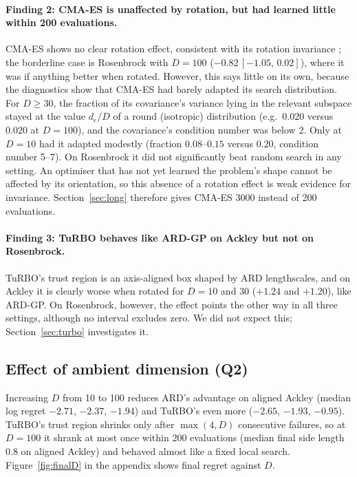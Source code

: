 \documentclass[12pt]{article}
\newcommand{\ci}[2]{\,[#1,\,#2]}
\begin{document}
\paragraph{Finding 2: CMA-ES is unaffected by rotation, but had learned little within 200 evaluations.}
CMA-ES shows no clear rotation effect, consistent with its rotation invariance \cite{hansen2016cma};
the borderline case is Rosenbrock with $D=100$ ($-0.82\ci{-1.05}{0.02}$), where it was if anything
better when rotated. However, this says little on its own, because the diagnostics show that CMA-ES
had barely adapted its search distribution. For $D\ge 30$, the fraction of its covariance's variance
lying in the relevant subspace stayed at the value $d_e/D$ of a round (isotropic) distribution
(e.g.\ $0.020$ versus $0.020$ at $D=100$), and the covariance's condition number was below 2. Only at
$D=10$ had it adapted modestly (fraction $0.08$--$0.15$ versus $0.20$, condition number 5--7). On
Rosenbrock it did not significantly beat random search in any setting. An optimiser that has not yet
learned the problem's shape cannot be affected by its orientation, so this absence of a rotation
effect is weak evidence for invariance. Section~\ref{sec:long} therefore gives CMA-ES 3000 instead of
200 evaluations.

\paragraph{Finding 3: TuRBO behaves like ARD-GP on Ackley but not on Rosenbrock.} TuRBO's trust region is
an axis-aligned box shaped by ARD lengthscales, and on Ackley it is clearly worse when rotated for
$D=10$ and $30$ ($+1.24$ and $+1.20$), like ARD-GP. On Rosenbrock, however, the effect points the
other way in all three settings, although no interval excludes zero. We did not expect this;
Section~\ref{sec:turbo} investigates it.

\subsection{Effect of ambient dimension (Q2)}
Increasing $D$ from 10 to 100 reduces ARD's advantage on aligned Ackley
(median log regret $-2.71$, $-2.37$, $-1.94$) and TuRBO's even more ($-2.65$, $-1.93$, $-0.95$).
TuRBO's trust region shrinks only after $\max(4,D)$ consecutive failures, so at $D=100$ it shrank at most
once within 200 evaluations (median final side length $0.8$ on aligned Ackley) and behaved almost
like a fixed local search. Figure~\ref{fig:finalD} in the appendix shows final regret against $D$.
\end{document}
